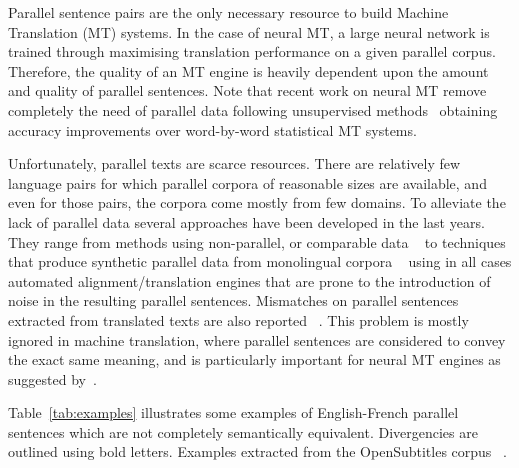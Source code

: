 \documentclass[11pt,a4paper]{article}
\begin{document}
Parallel sentence pairs are the only necessary resource to build Machine Translation (MT) systems.
In the case of neural MT, a large neural network is trained through maximising translation performance on a given parallel corpus. 
Therefore, the quality of an MT engine is heavily dependent upon the amount and quality of parallel sentences. 
Note that recent work on neural MT remove completely the need of parallel data following unsupervised methods~\cite{lample2018word,artetxe2018iclr} obtaining accuracy improvements over word-by-word statistical MT systems.

Unfortunately, parallel texts are scarce resources. 
There are relatively few language pairs for which parallel corpora of reasonable sizes are available, and even for those pairs, the corpora come mostly from few domains. 
To alleviate the lack of parallel data several approaches have been developed in the last years.
They range from methods using non-parallel, or comparable data ~\cite{Zhao:2002:APS:844380.844785,W04-3208,J05-4003,W17-2509,P17-3003} to techniques that produce synthetic parallel data from monolingual corpora ~\cite{P16-1009,W17-4714} using in all cases automated alignment/translation engines that are prone to the introduction of noise in the resulting parallel sentences. 
Mismatches on parallel sentences extracted from translated texts are also reported ~\cite{tiedemann2011bitext,XU16.310}. 
This problem is mostly ignored in machine translation, where parallel sentences are considered to convey the exact same meaning, and is particularly important for neural MT engines as suggested by~\cite{chen2016adaptation}.

Table~\ref{tab:examples} illustrates some examples of English-French parallel sentences which are not completely semantically equivalent. Divergencies are outlined using bold letters. Examples extracted from the OpenSubtitles corpus ~\cite{LisonTiedemann2016}. 
\end{document}
